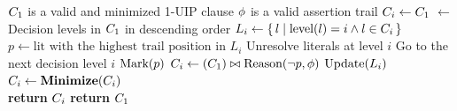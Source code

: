 \documentclass[runningheads]{llncs}
\begin{document}
\begin{algorithm}[t]
\caption{\IUIP}\label{alg:i-uip}
\begin{algorithmic}[1]
\Require  $C_{1}$ is a valid and minimized 1-UIP clause
\Require  $\phi$ is a valid assertion trail
\Procedure{\IUIP}{$\oneUIPClause, \assertionTrail$} 
    \State $C_{i} \gets C_{1} $  \label{ln:init}
    \State {} $\gets$ Decision levels in $C_{1}$ in descending order
 \label{ln:iterDecisionLvls}
    \State $L_{i} \gets \{\,l\mid\text{level}(l) = i \wedge l \in C_{i}\,\}$
     \label{ln:uip}
        \State $p \gets \text{lit with the highest trail position in } L_{i} $ \label{ln:trailaccess}
         \label{ln:resolvable}
            \If{$\IUIPPURE$}
                \State Unresolve literals at level $i$  \label{ln:unresolve}
                \State Go to the next decision level $i$ \label{ln:abondon}
            \ElsIf{$\IUIPMIN$}
                \State $\text{Mark}(p)$ \label{ln:mark}
            \EndIf
        \Else 
            \State  $C_{i} \gets (C_{1} ) \bowtie \text{Reason}(\neg{p}, \phi)$
           \State  $\text{Update}(L_{i})$
        \EndIf
    \EndWhile
\EndFor \label{ln:endCompleteResolution}
\\
\If{$\IUIPPURE$}\label{ln: 2ndMinStart}   
    \State $C_{i}  \gets \textbf{Minimize}(C_{i})$ 
\EndIf\label{ln: 2ndMinEnd}
\\
\If{$|\iUIPClause| < |\oneUIPClause|$} \label{ln:checkSize}
    \State \textbf{return} $C_{i}$
\Else
    \State \textbf{return} $C_{1}$
\EndIf  \label{ln:cSizeCheck}
\EndProcedure
\end{algorithmic}
\end{algorithm}
\end{document}

